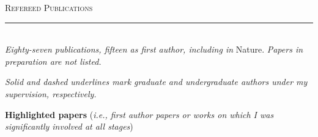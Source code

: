 \documentclass[11pt]{article}
\makeatletter
\def\vhrulefill#1{\leavevmode\leaders\hrule\@height#1\hfill \kern\z@}
\makeatother
\begin{document}



\clearpage

\textsc{Refereed Publications} \vhrulefill{0.4pt}\\


\textit{Eighty-seven publications, fifteen as first author, including in} Nature. \textit{Papers in preparation are not listed.}

\textit{Solid and dashed underlines mark graduate and undergraduate authors under my supervision, respectively.}\\

\vspace{-1mm}

\textbf{Highlighted papers} (\textit{i.e., first author papers or works on which I was significantly involved at all stages})\\

\vspace{-4mm}
\end{document}
